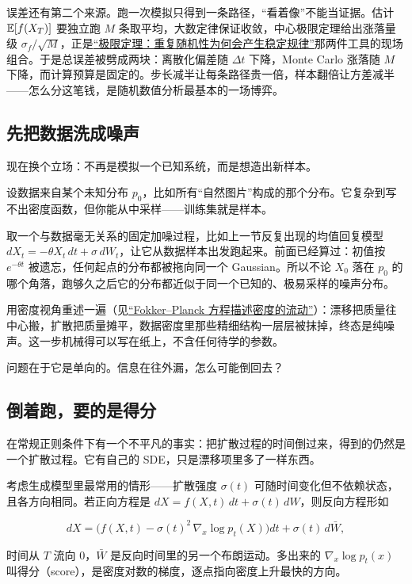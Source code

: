 误差还有第二个来源。跑一次模拟只得到一条路径，``看着像''不能当证据。估计 \(\mathbb{E}[f(X_T)]\) 要独立跑 \(M\) 条取平均，大数定律保证收敛，中心极限定理给出涨落量级 \(\sigma_f/\sqrt M\)，正是\hyperref[ch:044]{``极限定理：重复随机性为何会产生稳定规律''}那两件工具的现场组合。于是总误差被劈成两块：离散化偏差随 \(\Delta t\) 下降，Monte Carlo 涨落随 \(M\) 下降，而计算预算是固定的。步长减半让每条路径贵一倍，样本翻倍让方差减半——怎么分这笔钱，是随机数值分析最基本的一场博弈。

\subsection{先把数据洗成噪声}

现在换个立场：不再是模拟一个已知系统，而是想造出新样本。

设数据来自某个未知分布 \(p_0\)，比如所有``自然图片''构成的那个分布。它复杂到写不出密度函数，但你能从中采样——训练集就是样本。

取一个与数据毫无关系的固定加噪过程，比如上一节反复出现的均值回复模型 \(dX_t=-\theta X_t\,dt+\sigma\,dW_t\)，让它从数据样本出发跑起来。前面已经算过：初值按 \(e^{-\theta t}\) 被遗忘，任何起点的分布都被拖向同一个 Gaussian。所以不论 \(X_0\) 落在 \(p_0\) 的哪个角落，跑够久之后它的分布都近似于同一个已知的、极易采样的噪声分布。

用密度视角重述一遍（见\hyperref[sec:06-Random-Processes/06-Diffusion-and-SDE/02]{``Fokker--Planck 方程描述密度的流动''}）：漂移把质量往中心搬，扩散把质量摊平，数据密度里那些精细结构一层层被抹掉，终态是纯噪声。这一步机械得可以写在纸上，不含任何待学的参数。

问题在于它是单向的。信息在往外漏，怎么可能倒回去？

\subsection{倒着跑，要的是得分}

在常规正则条件下有一个不平凡的事实：把扩散过程的时间倒过来，得到的仍然是一个扩散过程。它有自己的 SDE，只是漂移项里多了一样东西。

考虑生成模型里最常用的情形——扩散强度 \(\sigma(t)\) 可随时间变化但不依赖状态，且各方向相同。若正向方程是 \(dX=f(X,t)\,dt+\sigma(t)\,dW\)，则反向方程形如

\[
dX=\Big(f(X,t)-\sigma(t)^2\,\nabla_x\log p_t(X)\Big)dt+\sigma(t)\,d\bar W,
\]

时间从 \(T\) 流向 \(0\)，\(\bar W\) 是反向时间里的另一个布朗运动。多出来的 \(\nabla_x\log p_t(x)\) 叫得分（score），是密度对数的梯度，逐点指向密度上升最快的方向。


